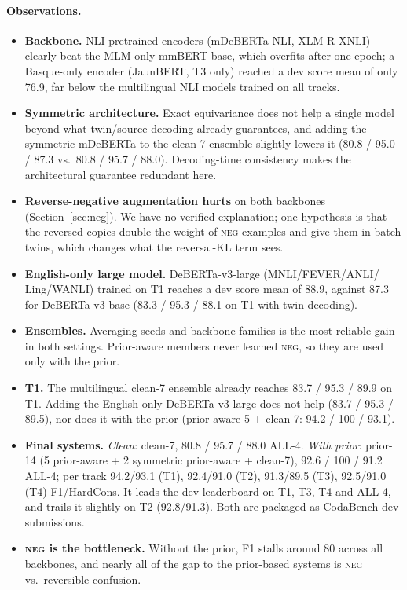\documentclass[11pt,a4paper]{article}
\newcommand{\NEG}{\textsc{neg}}
\begin{document}
\paragraph{Observations.}
\begin{itemize}
\item \textbf{Backbone.} NLI-pretrained encoders (mDeBERTa-NLI, XLM-R-XNLI)
  clearly beat the MLM-only mmBERT-base, which overfits after one epoch; a
  Basque-only encoder (JaunBERT, T3 only) reached a dev score mean of only 76.9,
  far below the multilingual NLI models trained on all tracks.
\item \textbf{Symmetric architecture.} Exact equivariance does not help a single
  model beyond what twin/source decoding already guarantees, and adding the
  symmetric mDeBERTa to the clean-7 ensemble slightly lowers it
  (80.8 / 95.0 / 87.3 vs.\ 80.8 / 95.7 / 88.0). Decoding-time consistency makes
  the architectural guarantee redundant here.
\item \textbf{Reverse-negative augmentation hurts} on both backbones
  (Section~\ref{sec:neg}). We have no verified explanation; one hypothesis is
  that the reversed copies double the weight of \NEG{} examples and give them
  in-batch twins, which changes what the reversal-KL term sees.
\item \textbf{English-only large model.} DeBERTa-v3-large (MNLI/FEVER/ANLI/
  Ling/WANLI) trained on T1 reaches a dev score mean of 88.9, against 87.3 for
  DeBERTa-v3-base (83.3 / 95.3 / 88.1 on T1 with twin decoding).
\item \textbf{Ensembles.} Averaging seeds and backbone families is the most
  reliable gain in both settings. Prior-aware members never learned \NEG, so
  they are used only with the prior.
\item \textbf{T1.} The multilingual clean-7 ensemble already reaches
  83.7 / 95.3 / 89.9 on T1. Adding the English-only DeBERTa-v3-large does not
  help (83.7 / 95.3 / 89.5), nor does it with the prior
  (prior-aware-5 + clean-7: 94.2 / 100 / 93.1).
\item \textbf{Final systems.} \emph{Clean}: clean-7, 80.8 / 95.7 / 88.0 ALL-4.
  \emph{With prior}: prior-14 (5 prior-aware + 2 symmetric prior-aware +
  clean-7), 92.6 / 100 / 91.2 ALL-4; per track 94.2/93.1 (T1), 92.4/91.0 (T2),
  91.3/89.5 (T3), 92.5/91.0 (T4) F1/HardCons. It leads the dev leaderboard on
  T1, T3, T4 and ALL-4, and trails it slightly on T2 (92.8/91.3). Both are
  packaged as CodaBench dev submissions.
\item \textbf{\NEG{} is the bottleneck.} Without the prior, F1 stalls around
  80 across all backbones, and nearly all of the gap to the prior-based systems
  is \NEG{} vs.\ reversible confusion.
\end{itemize}
\end{document}
